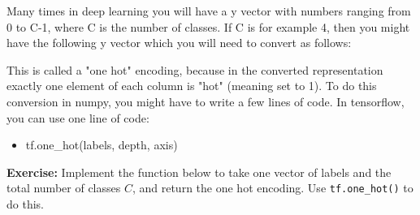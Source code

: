 \documentclass[11pt]{article}
\providecommand{\tightlist}{%
      \setlength{\itemsep}{0pt}\setlength{\parskip}{0pt}}
\begin{document}
Many times in deep learning you will have a y vector with numbers
ranging from 0 to C-1, where C is the number of classes. If C is for
example 4, then you might have the following y vector which you will
need to convert as follows:

This is called a "one hot" encoding, because in the converted
representation exactly one element of each column is "hot" (meaning set
to 1). To do this conversion in numpy, you might have to write a few
lines of code. In tensorflow, you can use one line of code:

\begin{itemize}
\tightlist
\item
  tf.one\_hot(labels, depth, axis)
\end{itemize}

\textbf{Exercise:} Implement the function below to take one vector of
labels and the total number of classes \(C\), and return the one hot
encoding. Use \texttt{tf.one\_hot()} to do this.
\end{document}
